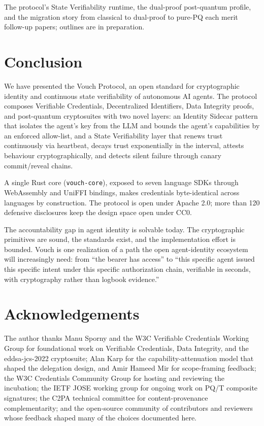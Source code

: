 \documentclass[11pt,a4paper]{article}
\begin{document}
The protocol's State Verifiability runtime, the dual-proof post-quantum profile, and the migration story from classical to dual-proof to pure-PQ each merit follow-up papers; outlines are in preparation.

\section{Conclusion}
\label{sec:conclusion}

We have presented the Vouch Protocol, an open standard for cryptographic identity and continuous state verifiability of autonomous AI agents. The protocol composes Verifiable Credentials, Decentralized Identifiers, Data Integrity proofs, and post-quantum cryptosuites with two novel layers: an Identity Sidecar pattern that isolates the agent's key from the LLM and bounds the agent's capabilities by an enforced allow-list, and a State Verifiability layer that renews trust continuously via heartbeat, decays trust exponentially in the interval, attests behaviour cryptographically, and detects silent failure through canary commit/reveal chains.

A single Rust core (\texttt{vouch-core}), exposed to seven language SDKs through WebAssembly and UniFFI bindings, makes credentials byte-identical across languages by construction. The protocol is open under Apache 2.0; more than 120 defensive disclosures keep the design space open under CC0.

The accountability gap in agent identity is solvable today. The cryptographic primitives are sound, the standards exist, and the implementation effort is bounded. Vouch is one realization of a path the open agent-identity ecosystem will increasingly need: from ``the bearer has access'' to ``this specific agent issued this specific intent under this specific authorization chain, verifiable in seconds, with cryptography rather than logbook evidence.''

\section*{Acknowledgements}

The author thanks Manu Sporny and the W3C Verifiable Credentials Working Group for foundational work on Verifiable Credentials, Data Integrity, and the eddsa-jcs-2022 cryptosuite; Alan Karp for the capability-attenuation model that shaped the delegation design, and Amir Hameed Mir for scope-framing feedback; the W3C Credentials Community Group for hosting and reviewing the incubation; the IETF JOSE working group for ongoing work on PQ/T composite signatures; the C2PA technical committee for content-provenance complementarity; and the open-source community of contributors and reviewers whose feedback shaped many of the choices documented here.
\end{document}
